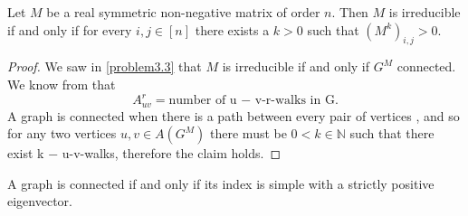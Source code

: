 \documentclass[a4paper, 11pt, oneside]{article}
\newenvironment{problem}[1]
  {\renewcommand\theinnercustomprob{#1}\innercustomprob}
  {\endinnercustomprob}
\newcommand{\N}{\mathbb{N}}
\begin{document}
\begin{problem}{3.4}\label{problem3.4}
Let $M$ be a real symmetric non-negative matrix of order $n$. Then $M$ is irreducible if and only if for every $i,j\in [n]$ there exists a $k > 0$ such that $(M^k)_{i,j}>0$.
\end{problem}

\begin{proof}
We saw in \ref{problem3.3} that $M$ is irreducible if and only if $G^M$ connected. 
We know from \cite[Lemma 1]{basic_info_spec} that 
\begin{equation*}
A^r_{uv} = \text{number of u − v-r-walks in G}. 
\end{equation*}
A graph is connected when there is a path between every pair of vertices \cite{connectivity}, and so for any two vertices $u, v \in A(G^M)$ there must be $0 < k \in \N$ such that there exist k − u-v-walks, therefore the claim holds.
\end{proof}

\begin{problem}{3.5}\label{problem3.5}
A graph is connected if and only if its index is simple with a strictly positive eigenvector.
\end{problem}
\end{document}
